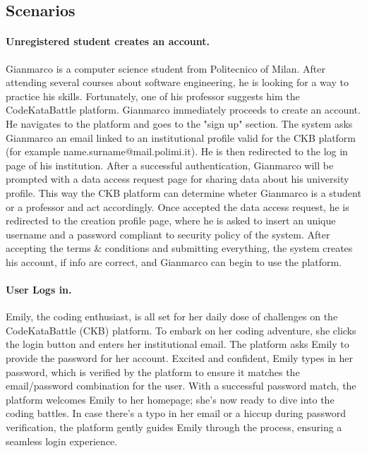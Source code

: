 \subsection{Scenarios}
\label{subsec:scenarios}%

\paragraph{Unregistered student creates an account.}
Gianmarco is a computer science student from Politecnico of Milan. After attending several courses about software engineering, 
he is looking for a way to practice his skills. Fortunately, one of his professor suggests him the CodeKataBattle platform.
Gianmarco immediately proceeds to create an account. He navigates to the platform and goes to the "sign up" section. 
The system asks Gianmarco an email linked 
to an institutional profile valid for the CKB platform (for example name.surname@mail.polimi.it). He is then redirected to the log in page of his institution.  
After a successful authentication, Gianmarco will be prompted with a data access request page for sharing data about his university profile. This way the CKB platform 
can determine wheter Gianmarco is a student or a professor and act accordingly. 
Once accepted the data access request, he is redirected to the creation profile page, where he is asked to insert an unique username and a password compliant to security policy of the system. 
After accepting the terms \& conditions 
and submitting everything, the system creates his account, if info are correct, and Gianmarco can begin to use the platform.

\paragraph*{User Logs in.}
Emily, the coding enthusiast, is all set for her daily dose of challenges on the CodeKataBattle (CKB) platform. 
To embark on her coding adventure, she clicks the login button and enters her institutional email.
The platform asks Emily to provide the password for her account. 
Excited and confident, Emily types in her password, which is verified by the platform to ensure it matches the email/password combination for the user.
With a successful password match, the platform welcomes Emily to her homepage; she's now ready to dive into the coding battles.
In case there's a typo in her email or a hiccup during password verification, the platform gently guides Emily through the process, ensuring a seamless login experience.

